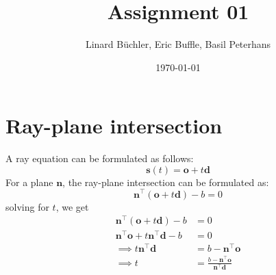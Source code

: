 \documentclass[a4paper, 12pt]{article}
\begin{document}
	\setlength{\parindent}{0cm}
	\renewcommand{\baselinestretch}{0.5}
	\title{Assignment 01}
	\author{ Linard Büchler, Eric Buffle, Basil Peterhans}
	\date{\today}
	\maketitle
	\tableofcontents{}
\section{Ray-plane intersection}
A ray equation can be formulated as follows:
$$
\textbf{s}(t) = \textbf{o}+ t\textbf{d}
$$
For a plane $\textbf{n}$, the ray-plane intersection can be formulated as:
$$
\textbf{n}^\top (\textbf{o}+ t\textbf{d})- b = 0
$$
solving for $t$, we get
\begin{align*}
\textbf{n}^\top (\textbf{o}+ t\textbf{d})- b &= 0\\
\textbf{n}^\top\textbf{o} + t\textbf{n}^\top\textbf{d} - b &=0\\
\implies t\textbf{n}^\top\textbf{d} &=b - \textbf{n}^\top\textbf{o}\\
\implies t &=\frac{b - \textbf{n}^\top\textbf{o}}{\textbf{n}^\top\textbf{d}} \\
\end{align*}
\end{document}
